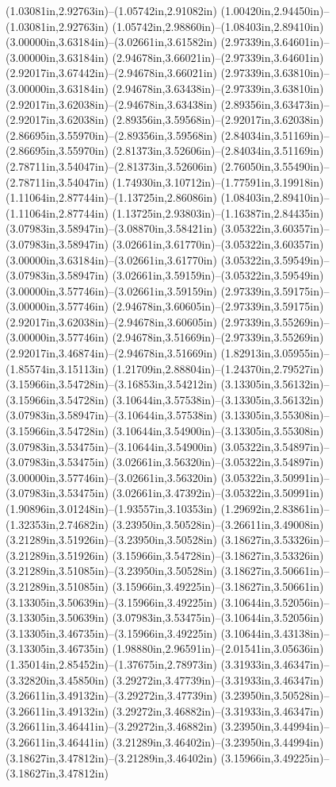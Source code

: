 (1.03081in,2.92763in)--(1.05742in,2.91082in) (1.00420in,2.94450in)--(1.03081in,2.92763in) (1.05742in,2.98860in)--(1.08403in,2.89410in) (3.00000in,3.63184in)--(3.02661in,3.61582in) (2.97339in,3.64601in)--(3.00000in,3.63184in) (2.94678in,3.66021in)--(2.97339in,3.64601in) (2.92017in,3.67442in)--(2.94678in,3.66021in) (2.97339in,3.63810in)--(3.00000in,3.63184in) (2.94678in,3.63438in)--(2.97339in,3.63810in) (2.92017in,3.62038in)--(2.94678in,3.63438in) (2.89356in,3.63473in)--(2.92017in,3.62038in) (2.89356in,3.59568in)--(2.92017in,3.62038in) (2.86695in,3.55970in)--(2.89356in,3.59568in) (2.84034in,3.51169in)--(2.86695in,3.55970in) (2.81373in,3.52606in)--(2.84034in,3.51169in) (2.78711in,3.54047in)--(2.81373in,3.52606in) (2.76050in,3.55490in)--(2.78711in,3.54047in) (1.74930in,3.10712in)--(1.77591in,3.19918in) (1.11064in,2.87744in)--(1.13725in,2.86086in) (1.08403in,2.89410in)--(1.11064in,2.87744in) (1.13725in,2.93803in)--(1.16387in,2.84435in) (3.07983in,3.58947in)--(3.08870in,3.58421in) (3.05322in,3.60357in)--(3.07983in,3.58947in) (3.02661in,3.61770in)--(3.05322in,3.60357in) (3.00000in,3.63184in)--(3.02661in,3.61770in) (3.05322in,3.59549in)--(3.07983in,3.58947in) (3.02661in,3.59159in)--(3.05322in,3.59549in) (3.00000in,3.57746in)--(3.02661in,3.59159in) (2.97339in,3.59175in)--(3.00000in,3.57746in) (2.94678in,3.60605in)--(2.97339in,3.59175in) (2.92017in,3.62038in)--(2.94678in,3.60605in) (2.97339in,3.55269in)--(3.00000in,3.57746in) (2.94678in,3.51669in)--(2.97339in,3.55269in) (2.92017in,3.46874in)--(2.94678in,3.51669in) (1.82913in,3.05955in)--(1.85574in,3.15113in) (1.21709in,2.88804in)--(1.24370in,2.79527in) (3.15966in,3.54728in)--(3.16853in,3.54212in) (3.13305in,3.56132in)--(3.15966in,3.54728in) (3.10644in,3.57538in)--(3.13305in,3.56132in) (3.07983in,3.58947in)--(3.10644in,3.57538in) (3.13305in,3.55308in)--(3.15966in,3.54728in) (3.10644in,3.54900in)--(3.13305in,3.55308in) (3.07983in,3.53475in)--(3.10644in,3.54900in) (3.05322in,3.54897in)--(3.07983in,3.53475in) (3.02661in,3.56320in)--(3.05322in,3.54897in) (3.00000in,3.57746in)--(3.02661in,3.56320in) (3.05322in,3.50991in)--(3.07983in,3.53475in) (3.02661in,3.47392in)--(3.05322in,3.50991in) (1.90896in,3.01248in)--(1.93557in,3.10353in) (1.29692in,2.83861in)--(1.32353in,2.74682in) (3.23950in,3.50528in)--(3.26611in,3.49008in) (3.21289in,3.51926in)--(3.23950in,3.50528in) (3.18627in,3.53326in)--(3.21289in,3.51926in) (3.15966in,3.54728in)--(3.18627in,3.53326in) (3.21289in,3.51085in)--(3.23950in,3.50528in) (3.18627in,3.50661in)--(3.21289in,3.51085in) (3.15966in,3.49225in)--(3.18627in,3.50661in) (3.13305in,3.50639in)--(3.15966in,3.49225in) (3.10644in,3.52056in)--(3.13305in,3.50639in) (3.07983in,3.53475in)--(3.10644in,3.52056in) (3.13305in,3.46735in)--(3.15966in,3.49225in) (3.10644in,3.43138in)--(3.13305in,3.46735in) (1.98880in,2.96591in)--(2.01541in,3.05636in) (1.35014in,2.85452in)--(1.37675in,2.78973in) (3.31933in,3.46347in)--(3.32820in,3.45850in) (3.29272in,3.47739in)--(3.31933in,3.46347in) (3.26611in,3.49132in)--(3.29272in,3.47739in) (3.23950in,3.50528in)--(3.26611in,3.49132in) (3.29272in,3.46882in)--(3.31933in,3.46347in) (3.26611in,3.46441in)--(3.29272in,3.46882in) (3.23950in,3.44994in)--(3.26611in,3.46441in) (3.21289in,3.46402in)--(3.23950in,3.44994in) (3.18627in,3.47812in)--(3.21289in,3.46402in) (3.15966in,3.49225in)--(3.18627in,3.47812in) 